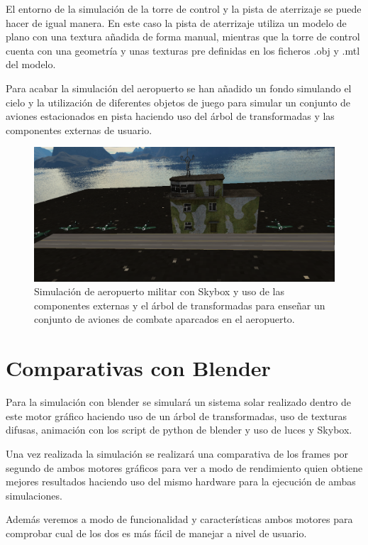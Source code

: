 \documentclass[a4paper, 17pt]{book}
\begin{document}
El entorno de la simulación de la torre de control y la pista de aterrizaje se puede hacer de igual manera. En este caso la pista de aterrizaje
utiliza un modelo de plano con una textura añadida de forma manual, mientras que la torre de control cuenta con una geometría y unas texturas
pre definidas en los ficheros .obj y .mtl del modelo.

Para acabar la simulación del aeropuerto se han añadido un fondo simulando el cielo y la utilización de diferentes objetos de juego para
simular un conjunto de aviones estacionados en pista haciendo uso del árbol de transformadas y las componentes externas de usuario.

\begin{figure}[hbt!]
    \centering
    \includegraphics[scale=0.25, keepaspectratio]{img/AirportMultiplePlanes.png}
    \caption{Simulación de aeropuerto militar con Skybox y uso de las componentes externas y el árbol de transformadas para enseñar un
    conjunto de aviones de combate aparcados en el aeropuerto.}
    \label{figura:Avion}
\end{figure}

\section{Comparativas con Blender}
\label{sec:BlenderComp}

Para la simulación con blender se simulará un sistema solar realizado dentro de este motor gráfico haciendo uso de un árbol de transformadas,
uso de texturas difusas, animación con los script de python de blender y uso de luces y Skybox. 

Una vez realizada la  simulación se realizará una comparativa de los frames por segundo de ambos motores gráficos para ver a modo de
rendimiento quien obtiene mejores resultados haciendo uso del mismo hardware para la ejecución de ambas simulaciones.

Además veremos a modo de funcionalidad y características ambos motores para comprobar cual de los dos es más fácil de manejar a nivel
de usuario.
\end{document}
